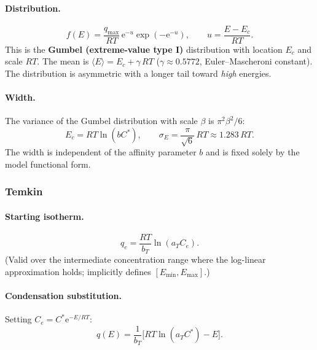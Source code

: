 \documentclass[journal=jacsat,manuscript=article]{achemso}
\begin{document}
\paragraph{Distribution.}
\begin{equation}
	f(E) = \frac{q_{\max}}{RT}\,\mathrm{e}^{-u}\exp\!\left(-\mathrm{e}^{-u}\right),
	\qquad u = \frac{E-E_c}{RT}.
	\label{eq:si_fE_jov}
\end{equation}
This is the \textbf{Gumbel (extreme-value type I)} distribution with location $E_c$
and scale $RT$. The mean is $\langle E\rangle = E_c + \gamma\,RT$
($\gamma \approx 0.5772$, Euler--Mascheroni constant).
The distribution is asymmetric with a longer tail toward \emph{high} energies.

\paragraph{Width.}
The variance of the Gumbel distribution with scale $\beta$ is $\pi^2\beta^2/6$:
\begin{equation}
	E_c = RT\ln(bC^{\ast}),
	\qquad
	\sigma_E = \frac{\pi}{\sqrt{6}}\,RT \approx 1.283\,RT.
	\label{eq:si_sigmaE_jov}
\end{equation}
The width is independent of the affinity parameter $b$ and is fixed solely by
the model functional form.

\subsubsection{Temkin}

\paragraph{Starting isotherm.}
\begin{equation}
	q_e = \frac{RT}{b_T}\ln(a_T C_e).
\end{equation}
(Valid over the intermediate concentration range where the log-linear
approximation holds; implicitly defines $[E_{\min}, E_{\max}]$.)

\paragraph{Condensation substitution.}
Setting $C_e = C^{\ast}\mathrm{e}^{-E/RT}$:
\begin{equation}
	q(E) = \frac{1}{b_T}\bigl[RT\ln(a_T C^{\ast}) - E\bigr].
\end{equation}
\end{document}
